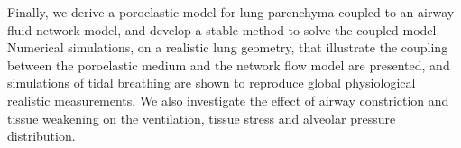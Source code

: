 Finally, we derive a poroelastic model for lung parenchyma coupled to an airway fluid network model, and develop a stable method to solve the coupled model.
%
Numerical simulations, on a realistic lung geometry, that illustrate the coupling between the poroelastic medium and the network flow model are presented, and simulations of tidal breathing are shown to reproduce global physiological realistic measurements. We also investigate the effect of airway constriction and tissue weakening on the ventilation, tissue stress and alveolar pressure distribution.

